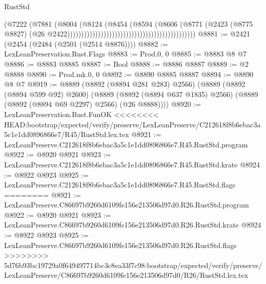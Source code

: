 \begin{lexlean}{RustStd}
\begin{coremodule}
{\begin{coremodule}
{{{{{{{{{{{{{{{{{{{{{{{{{{{{{{{{{{{{{{{                                                                            (@7222
                                                                              (@7881
                                                                                (@8004
                                                                                  (@8124
                                                                                    (@8454
                                                                                      (@8594
                                                                                        (@8606
                                                                                          (@8771
                                                                                            (@2423
                                                                                              (@8775
                                                                                                @8827)
                                                                                              (@26
                                                                                                @2422))))))))))))))))))))))))))))))))))))))))))))))
@8881 := @2421 (@2454 (@2484 (@2501 (@2514 @8876))))
@8882 := LexLeanPreservation.Rust.Flags
@8883 := Prod.{0, 0}
@8885 := @8883 @8 @7
@8886 := @8883 @8885
@8887 := Bool
@8888 := @8886 @8887
@8889 := @2 @8888
@8890 := Prod.mk.{0, 0}
@8892 := @8890 @8885 @8887
@8894 := @8890 @8 @7
@8919 := @8889
    (@8892 (@8894 @281 @283) @2566)
    (@8889
      (@8892 (@8894 @599 @92) @2600)
      (@8889 (@8892 (@8894 @637 @1835) @2566) (@8889 (@8892 (@8894 @69 @2297) @2566) (@26 @8888))))
@8920 := LexLeanPreservation.Rust.FunOK
<<<<<<<< HEAD:bootstrap/expected/verify/preserve/LexLeanPreserve/C212618f8b6ebac3a5c1e1dd0896866e7/R45/RustStd.lex.tex
@8921 := LexLeanPreserve.C212618f8b6ebac3a5c1e1dd0896866e7.R45.RustStd.program
@8922 := @8920 @8921
@8923 := LexLeanPreserve.C212618f8b6ebac3a5c1e1dd0896866e7.R45.RustStd.krate
@8924 := @8922 @8923
@8925 := LexLeanPreserve.C212618f8b6ebac3a5c1e1dd0896866e7.R45.RustStd.flags
========
@8921 := LexLeanPreserve.C86697b9260d6109fe156e213506d97d0.R26.RustStd.program
@8922 := @8920 @8921
@8923 := LexLeanPreserve.C86697b9260d6109fe156e213506d97d0.R26.RustStd.krate
@8924 := @8922 @8923
@8925 := LexLeanPreserve.C86697b9260d6109fe156e213506d97d0.R26.RustStd.flags
>>>>>>>> 5d76b93bc19729a0f649497714bc3c8ea33f7c98:bootstrap/expected/verify/preserve/LexLeanPreserve/C86697b9260d6109fe156e213506d97d0/R26/RustStd.lex.tex
}}}}}}}}}}}}}}}}}}}}}}}}}}}}}}}}}}}}}}}
\end{coremodule}}
\end{coremodule}
\end{lexlean}
